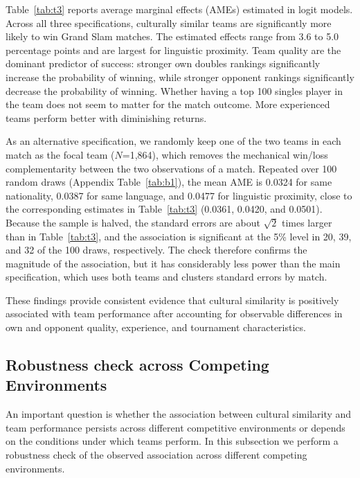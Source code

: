 \documentclass[10pt]{article}
\begin{document}
Table~\ref{tab:t3} reports average marginal effects (AMEs) estimated in logit models. %
Across all three specifications, culturally similar teams are significantly more likely to win Grand Slam matches. The estimated effects range from 3.6 to 5.0 percentage points and are largest for linguistic proximity. Team quality are the dominant predictor of success: stronger own doubles rankings significantly increase the probability of winning, while stronger opponent rankings significantly decrease the probability of winning. Whether having a top 100 singles player in the team does not seem to matter for the match outcome. More experienced teams perform better with diminishing returns.

As an alternative specification, we randomly keep one of the two teams in each match as the focal team ($N$=1,864), which removes the mechanical win/loss complementarity between the two observations of a match. Repeated over 100 random draws (Appendix Table~\ref{tab:b1}), the mean AME is 0.0324 for same nationality, 0.0387 for same language, and 0.0477 for linguistic proximity, close to the corresponding estimates in Table~\ref{tab:t3} (0.0361, 0.0420, and 0.0501). Because the sample is halved, the standard errors are about $\sqrt{2}$ times larger than in Table~\ref{tab:t3}, and the association is significant at the 5\% level in 20, 39, and 32 of the 100 draws, respectively. The check therefore confirms the magnitude of the association, but it has considerably less power than the main specification, which uses both teams and clusters standard errors by match.

These findings provide consistent evidence that cultural similarity is positively associated with team performance after accounting for observable differences in own and opponent quality,  experience, and tournament characteristics.


\subsection{Robustness check across Competing Environments} 


An important question is whether the association between cultural similarity and team performance persists across different competitive environments or depends on the conditions under which teams perform.  In this subsection we perform a robustness check of the observed association across different  competing environments.
\end{document}
